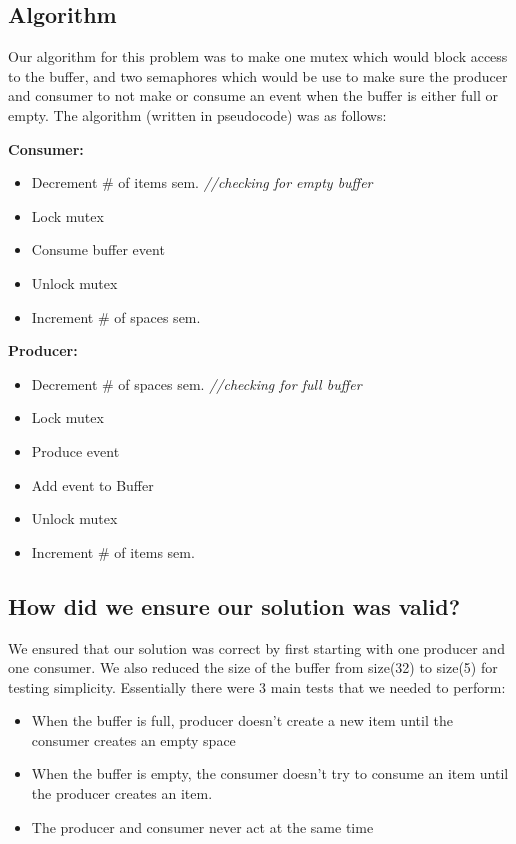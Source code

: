 \documentclass{article}
\begin{document}
\subsection{Algorithm}

Our algorithm for this problem was to make one mutex which would block access to the buffer, and two semaphores which would be use to make sure the producer and consumer to not make or consume an event when the buffer is either full or empty. The algorithm (written in pseudocode) was as follows: 


\textbf{Consumer:}
\begin{itemize}
\item Decrement \# of items sem. \textit{//checking for empty buffer}
\item Lock mutex
\item Consume buffer event
\item Unlock mutex
\item Increment \# of spaces sem.
\end{itemize}


\textbf{Producer:}
\begin{itemize}
\item Decrement \# of spaces sem. \textit{//checking for full buffer}
\item Lock mutex
\item Produce event
\item Add event to Buffer
\item Unlock mutex
\item Increment \# of items sem.
\end{itemize}

\subsection{How did we ensure our solution was valid?}
We ensured that our solution was correct by first starting with one producer and one consumer. We also reduced the size of the buffer from size(32) to size(5) for testing simplicity. Essentially there were 3 main tests that we needed to perform:
\begin{itemize}
\item When the buffer is full, producer doesn’t create a new item until the consumer creates an empty space
\item When the buffer is empty, the consumer doesn’t try to consume an item until the producer creates an item.
\item The producer and consumer never act at the same time
\end{itemize}
\end{document}
